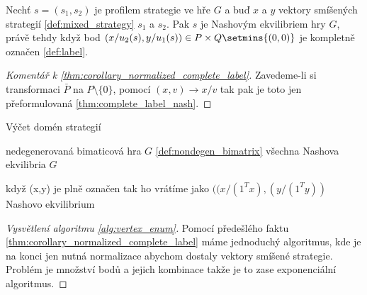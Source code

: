 \begin{theorem}
\label{thm:corollary_normalized_complete_label}
Nechť $s = (s_1, s_2)$ je profilem strategie ve hře $G$ a buď $x$ a  $y$ vektory smíšených strategií \ref{def:mixed_strategy} $s_1$ a $s_2$.
Pak $s$ je Nashovým ekvilibriem hry $G$, právě tehdy když bod $(x/u_2(s), y/u_1(s)) \in P \times Q \setmins \{(0,0)\}$ je kompletně označen \ref{def:label}.
\end{theorem}
\begin{proof}[Komentář k \ref{thm:corollary_normalized_complete_label}]
    Zavedeme-li si transformaci $\bar{P}$ na $P \setminus \{0\}$, pomocí $(x,v)\rightarrow x/v$ tak pak je toto jen přeformulovaná \ref{thm:complete_label_nash}. 
\end{proof}

\begin{algorithm}
    \algrenewcommand{}
    \algrenewcommand{}
    \caption{Výčet domén strategií}
    \label{alg:vertex_enum}
    \begin{algorithmic}[1]
        \Require  nedegenerovaná bimaticová hra $G$ \ref{def:nondegen_bimatrix}
        \Ensure  všechna Nashova ekvilibria $G$
        
            \State když (x,y) je plně označen tak ho vrátíme jako $((x/(1^Tx),(y/(1^Ty))$ Nashovo ekvilibrium
        \EndFor
    \end{algorithmic}
\end{algorithm}

\begin{proof}[Vysvětlení algoritmu \ref{alg:vertex_enum}]
    Pomocí předešlého faktu \ref{thm:corollary_normalized_complete_label} máme jednoduchý algoritmus, kde je na konci jen nutná normalizace abychom dostaly vektory smíšené strategie.
    Problém je množství bodů a jejich kombinace takže je to zase exponenciální algoritmus. 
\end{proof}
